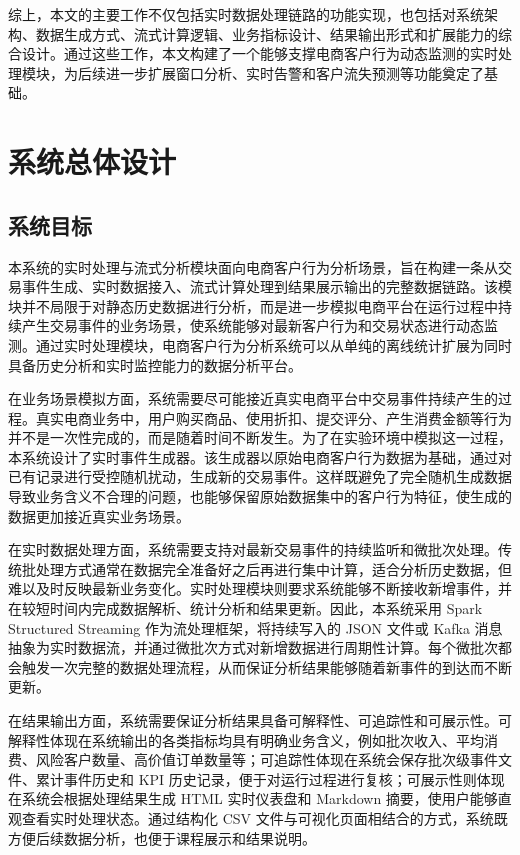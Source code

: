 \documentclass[12pt,hyperref,a4paper,UTF8]{ctexart}
\begin{document}
综上，本文的主要工作不仅包括实时数据处理链路的功能实现，也包括对系统架构、数据生成方式、流式计算逻辑、业务指标设计、结果输出形式和扩展能力的综合设计。通过这些工作，本文构建了一个能够支撑电商客户行为动态监测的实时处理模块，为后续进一步扩展窗口分析、实时告警和客户流失预测等功能奠定了基础。


\section{系统总体设计}

\subsection{系统目标}

本系统的实时处理与流式分析模块面向电商客户行为分析场景，旨在构建一条从交易事件生成、实时数据接入、流式计算处理到结果展示输出的完整数据链路。该模块并不局限于对静态历史数据进行分析，而是进一步模拟电商平台在运行过程中持续产生交易事件的业务场景，使系统能够对最新客户行为和交易状态进行动态监测。通过实时处理模块，电商客户行为分析系统可以从单纯的离线统计扩展为同时具备历史分析和实时监控能力的数据分析平台。

在业务场景模拟方面，系统需要尽可能接近真实电商平台中交易事件持续产生的过程。真实电商业务中，用户购买商品、使用折扣、提交评分、产生消费金额等行为并不是一次性完成的，而是随着时间不断发生。为了在实验环境中模拟这一过程，本系统设计了实时事件生成器。该生成器以原始电商客户行为数据为基础，通过对已有记录进行受控随机扰动，生成新的交易事件。这样既避免了完全随机生成数据导致业务含义不合理的问题，也能够保留原始数据集中的客户行为特征，使生成的数据更加接近真实业务场景。

在实时数据处理方面，系统需要支持对最新交易事件的持续监听和微批次处理。传统批处理方式通常在数据完全准备好之后再进行集中计算，适合分析历史数据，但难以及时反映最新业务变化。实时处理模块则要求系统能够不断接收新增事件，并在较短时间内完成数据解析、统计分析和结果更新。因此，本系统采用 Spark Structured Streaming 作为流处理框架，将持续写入的 JSON 文件或 Kafka 消息抽象为实时数据流，并通过微批次方式对新增数据进行周期性计算。每个微批次都会触发一次完整的数据处理流程，从而保证分析结果能够随着新事件的到达而不断更新。

在结果输出方面，系统需要保证分析结果具备可解释性、可追踪性和可展示性。可解释性体现在系统输出的各类指标均具有明确业务含义，例如批次收入、平均消费、风险客户数量、高价值订单数量等；可追踪性体现在系统会保存批次级事件文件、累计事件历史和 KPI 历史记录，便于对运行过程进行复核；可展示性则体现在系统会根据处理结果生成 HTML 实时仪表盘和 Markdown 摘要，使用户能够直观查看实时处理状态。通过结构化 CSV 文件与可视化页面相结合的方式，系统既方便后续数据分析，也便于课程展示和结果说明。
\end{document}
